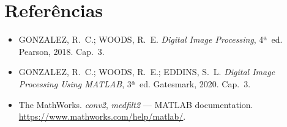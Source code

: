 \documentclass[12pt,a4paper]{article}
\begin{document}
\section*{Referências}
\begin{itemize}
  \item GONZALEZ, R.~C.; WOODS, R.~E. \textit{Digital Image Processing},
        4ª~ed. Pearson, 2018. Cap.~3.
  \item GONZALEZ, R.~C.; WOODS, R.~E.; EDDINS, S.~L. \textit{Digital
        Image Processing Using MATLAB}, 3ª~ed. Gatesmark, 2020. Cap.~3.
  \item The MathWorks. \textit{conv2}, \textit{medfilt2} — MATLAB
        documentation. \url{https://www.mathworks.com/help/matlab/}.
\end{itemize}
\end{document}
